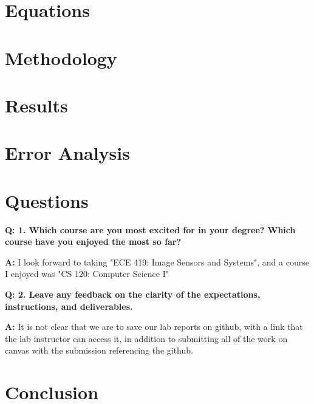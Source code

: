 \documentclass[12pt,a4paper]{article}
\newcommand{\Q}{\bigskip\bfseries Q: }
\newcommand{\A}{\par\textbf{A:} \normalfont}
\begin{document}
\section{Equations}\label{sec:lit-rev}
\section{Methodology}\label{sec:meth}
\section{Results}\label{sec:res}
\section{Error Analysis}\label{sec:res}
\section{Questions}\label{sec:res}
\Q 1. Which course are you most excited for in your degree? Which course have you enjoyed the most so far?
\A I look forward to taking "ECE 419: Image Sensors and Systems", and a course I enjoyed was "CS 120: Computer Science I"

\Q 2. Leave any feedback on the clarity of the expectations, instructions, and deliverables.
\A It is not clear that we are to save our lab reports on github, with a link that the lab instructor can access it, in addition to submitting all of the work on canvas with the submission referencing the github.

\section{Conclusion}\label{sec:res}


\end{document}
